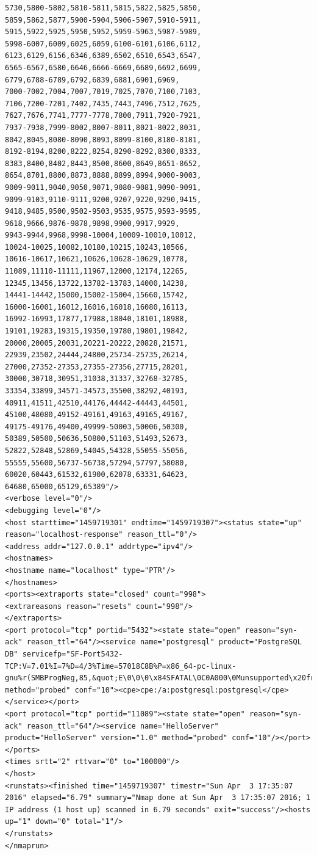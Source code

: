 \documentclass[12pt,a4paper]{report}
\begin{document}
\begin{lstlisting}[breaklines]
5730,5800-5802,5810-5811,5815,5822,5825,5850,
5859,5862,5877,5900-5904,5906-5907,5910-5911,
5915,5922,5925,5950,5952,5959-5963,5987-5989,
5998-6007,6009,6025,6059,6100-6101,6106,6112,
6123,6129,6156,6346,6389,6502,6510,6543,6547,
6565-6567,6580,6646,6666-6669,6689,6692,6699,
6779,6788-6789,6792,6839,6881,6901,6969,
7000-7002,7004,7007,7019,7025,7070,7100,7103,
7106,7200-7201,7402,7435,7443,7496,7512,7625,
7627,7676,7741,7777-7778,7800,7911,7920-7921,
7937-7938,7999-8002,8007-8011,8021-8022,8031,
8042,8045,8080-8090,8093,8099-8100,8180-8181,
8192-8194,8200,8222,8254,8290-8292,8300,8333,
8383,8400,8402,8443,8500,8600,8649,8651-8652,
8654,8701,8800,8873,8888,8899,8994,9000-9003,
9009-9011,9040,9050,9071,9080-9081,9090-9091,
9099-9103,9110-9111,9200,9207,9220,9290,9415,
9418,9485,9500,9502-9503,9535,9575,9593-9595,
9618,9666,9876-9878,9898,9900,9917,9929,
9943-9944,9968,9998-10004,10009-10010,10012,
10024-10025,10082,10180,10215,10243,10566,
10616-10617,10621,10626,10628-10629,10778,
11089,11110-11111,11967,12000,12174,12265,
12345,13456,13722,13782-13783,14000,14238,
14441-14442,15000,15002-15004,15660,15742,
16000-16001,16012,16016,16018,16080,16113,
16992-16993,17877,17988,18040,18101,18988,
19101,19283,19315,19350,19780,19801,19842,
20000,20005,20031,20221-20222,20828,21571,
22939,23502,24444,24800,25734-25735,26214,
27000,27352-27353,27355-27356,27715,28201,
30000,30718,30951,31038,31337,32768-32785,
33354,33899,34571-34573,35500,38292,40193,
40911,41511,42510,44176,44442-44443,44501,
45100,48080,49152-49161,49163,49165,49167,
49175-49176,49400,49999-50003,50006,50300,
50389,50500,50636,50800,51103,51493,52673,
52822,52848,52869,54045,54328,55055-55056,
55555,55600,56737-56738,57294,57797,58080,
60020,60443,61532,61900,62078,63331,64623,
64680,65000,65129,65389"/>
<verbose level="0"/>
<debugging level="0"/>
<host starttime="1459719301" endtime="1459719307"><status state="up" reason="localhost-response" reason_ttl="0"/>
<address addr="127.0.0.1" addrtype="ipv4"/>
<hostnames>
<hostname name="localhost" type="PTR"/>
</hostnames>
<ports><extraports state="closed" count="998">
<extrareasons reason="resets" count="998"/>
</extraports>
<port protocol="tcp" portid="5432"><state state="open" reason="syn-ack" reason_ttl="64"/><service name="postgresql" product="PostgreSQL DB" servicefp="SF-Port5432-TCP:V=7.01%I=7%D=4/3%Time=57018C8B%P=x86_64-pc-linux-gnu%r(SMBProgNeg,85,&quot;E\0\0\0\x84SFATAL\0C0A000\0Munsupported\x20frontend\x20protocol\x2065363\.19778:\x20server\x20supports\x201\.0\x20to\x203\.0\0Fpostmaster\.c\0L1991\0RProcessStartupPacket\0\0&quot;);" method="probed" conf="10"><cpe>cpe:/a:postgresql:postgresql</cpe></service></port>
<port protocol="tcp" portid="11089"><state state="open" reason="syn-ack" reason_ttl="64"/><service name="HelloServer" product="HelloServer" version="1.0" method="probed" conf="10"/></port>
</ports>
<times srtt="2" rttvar="0" to="100000"/>
</host>
<runstats><finished time="1459719307" timestr="Sun Apr  3 17:35:07 2016" elapsed="6.79" summary="Nmap done at Sun Apr  3 17:35:07 2016; 1 IP address (1 host up) scanned in 6.79 seconds" exit="success"/><hosts up="1" down="0" total="1"/>
</runstats>
</nmaprun>
\end{lstlisting}
\end{document}
